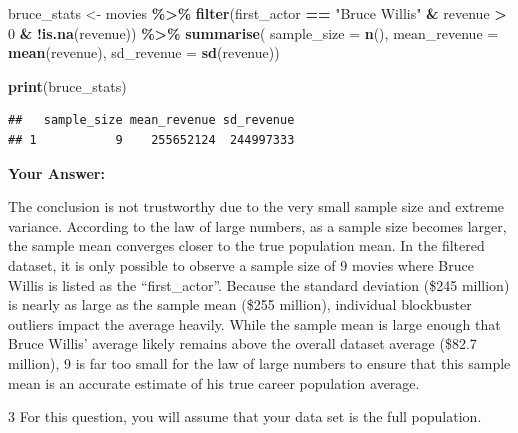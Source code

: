 \documentclass[
]{article}
\newenvironment{Shaded}{\begin{snugshade}}{\end{snugshade}}
\newcommand{\AttributeTok}[1]{\textcolor[rgb]{0.13,0.29,0.53}{#1}}
\newcommand{\DecValTok}[1]{\textcolor[rgb]{0.00,0.00,0.81}{#1}}
\newcommand{\FunctionTok}[1]{\textcolor[rgb]{0.13,0.29,0.53}{\textbf{#1}}}
\newcommand{\NormalTok}[1]{#1}
\newcommand{\OtherTok}[1]{\textcolor[rgb]{0.56,0.35,0.01}{#1}}
\newcommand{\SpecialCharTok}[1]{\textcolor[rgb]{0.81,0.36,0.00}{\textbf{#1}}}
\newcommand{\StringTok}[1]{\textcolor[rgb]{0.31,0.60,0.02}{#1}}
\begin{document}
\begin{Shaded}
\begin{Highlighting}[]
\NormalTok{bruce\_stats }\OtherTok{\textless{}{-}}\NormalTok{ movies }\SpecialCharTok{\%\textgreater{}\%}
  \FunctionTok{filter}\NormalTok{(first\_actor }\SpecialCharTok{==} \StringTok{"Bruce Willis"} \SpecialCharTok{\&}\NormalTok{ revenue }\SpecialCharTok{\textgreater{}} \DecValTok{0} \SpecialCharTok{\&} \SpecialCharTok{!}\FunctionTok{is.na}\NormalTok{(revenue)) }\SpecialCharTok{\%\textgreater{}\%}
  \FunctionTok{summarise}\NormalTok{(}
    \AttributeTok{sample\_size =} \FunctionTok{n}\NormalTok{(),}
    \AttributeTok{mean\_revenue =} \FunctionTok{mean}\NormalTok{(revenue),}
    \AttributeTok{sd\_revenue =} \FunctionTok{sd}\NormalTok{(revenue))}

\FunctionTok{print}\NormalTok{(bruce\_stats)}
\end{Highlighting}
\end{Shaded}

\begin{verbatim}
##   sample_size mean_revenue sd_revenue
## 1           9    255652124  244997333
\end{verbatim}

\textbf{Your Answer:}

The conclusion is not trustworthy due to the very small sample size and
extreme variance. According to the law of large numbers, as a sample
size becomes larger, the sample mean converges closer to the true
population mean. In the filtered dataset, it is only possible to observe
a sample size of 9 movies where Bruce Willis is listed as the
``first\_actor''. Because the standard deviation (\$245 million) is
nearly as large as the sample mean (\$255 million), individual
blockbuster outliers impact the average heavily. While the sample mean
is large enough that Bruce Willis' average likely remains above the
overall dataset average (\$82.7 million), 9 is far too small for the law
of large numbers to ensure that this sample mean is an accurate estimate
of his true career population average.

3 For this question, you will assume that your data set is the full
population.
\end{document}
